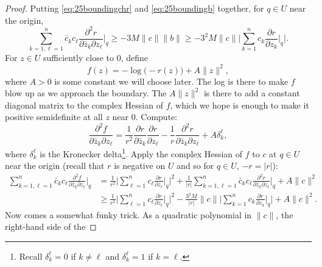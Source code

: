 \documentclass[12pt,openany]{book}
\newcommand{\sabs}[1]{\lvert {#1} \rvert}
\newcommand{\snorm}[1]{\lVert {#1} \rVert}
\newcommand{\Babs}[1]{\Bigl\lvert {#1} \Bigr\rvert}
\newcommand{\BBabs}[1]{\Biggl\lvert {#1} \Biggr\rvert}
\theoremstyle{plain}
\theoremstyle{remark}
\theoremstyle{definition}
\theoremstyle{exercise}
\theoremstyle{example}
\begin{document}
\begin{proof}
Putting \eqref{eq:25boundingchr} and \eqref{eq:25boundingb} together,
for $q \in U$ near the origin,
\begin{equation*}
\sum_{k=1,\ell=1}^n
\bar{c}_k c_\ell \frac{\partial^2 r}{\partial \bar{z}_k \partial z_\ell} \Big|_q
\geq -3M \snorm{c} \snorm{b} %
\geq
-3^2 M \snorm{c}\BBabs{\sum_{k=1}^n c_k \frac{\partial r}{\partial z_k}
\Big|_q} .
\end{equation*}
For $z \in U$ sufficiently close to $0$, define
\begin{equation*}
f(z) = -\log \bigl(-r(z)\bigr) + A \snorm{z}^2 ,
\end{equation*}
where $A > 0$ is some constant we will choose later.
The log is there to make $f$ blow up as we approach the boundary.
The $A \snorm{z}^2$ is there to add a constant diagonal matrix to the complex
Hessian of $f$, which we hope is enough to make it positive semidefinite at
all $z$ near $0$.
Compute:
\begin{equation*}
\frac{\partial^2 f}{\partial \bar{z}_k \partial z_\ell}
=
\frac{1}{r^2}
\frac{\partial r}{\partial \bar{z}_k}
\frac{\partial r}{\partial z_\ell}
-
\frac{1}{r}
\frac{\partial^2 r}{\partial \bar{z}_k \partial z_\ell}
+
A\delta_{k}^{\ell} ,
\end{equation*}
where $\delta_k^\ell$ is the Kronecker delta\footnote{%
Recall $\delta_k^\ell = 0$ if $k\not= \ell$ and $\delta_k^\ell = 1$ if $k =
\ell$.}.
Apply the complex Hessian of $f$ to $c$ at $q \in U$ near the origin
(recall that $r$ is negative on $U$ and so for $q \in U$, $-r = \sabs{r}$):
\begin{equation*}
\begin{split}
\sum_{k=1,\ell=1}^n
\bar{c}_k c_\ell \frac{\partial^2 f}{\partial \bar{z}_k \partial z_\ell} \Big|_q
& =
\frac{1}{r^2}
\BBabs{
\sum_{\ell=1}^n
c_\ell
\frac{\partial r}{\partial z_\ell} \Big|_q
}^2
+
\frac{1}{\sabs{r}}
\sum_{k=1,\ell=1}^n
\bar{c}_k
c_\ell
\frac{\partial^2 r}{\partial \bar{z}_k \partial z_\ell} \Big|_q
+
A \snorm{c}^2
\\
& \geq
\frac{1}{r^2}
\BBabs{
\sum_{\ell=1}^n
c_\ell
\frac{\partial r}{\partial z_\ell} \Big|_q
}^2
-
\frac{3^2 M}{\sabs{r}}
\snorm{c}
\BBabs{\sum_{k=1}^n c_k \frac{\partial r}{\partial z_k} \Big|_q}
+
A \snorm{c}^2 .
\end{split}
\end{equation*}
Now comes a somewhat funky trick.
As a quadratic polynomial in $\snorm{c}$, the right-hand side of the

\end{proof}
\end{document}
